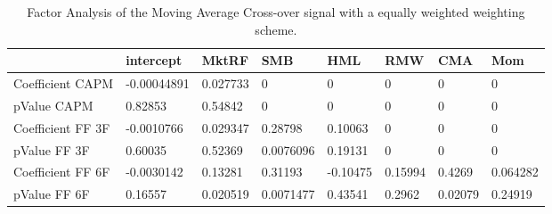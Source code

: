 \begin{table}[H]
\centering
\begin{tabular}{llllllll}
\hline& intercept & MktRF & SMB & HML & RMW & CMA & Mom \\ 
\hline 
Coefficient CAPM & -0.00044891 & 0.027733 & 0 & 0 & 0 & 0 & 0 \\ 
pValue CAPM & 0.82853 & 0.54842 & 0 & 0 & 0 & 0 & 0 \\ 
Coefficient FF 3F & -0.0010766 & 0.029347 & 0.28798 & 0.10063 & 0 & 0 & 0 \\ 
pValue FF 3F & 0.60035 & 0.52369 & 0.0076096 & 0.19131 & 0 & 0 & 0 \\ 
Coefficient FF 6F & -0.0030142 & 0.13281 & 0.31193 & -0.10475 & 0.15994 & 0.4269 & 0.064282 \\ 
pValue FF 6F & 0.16557 & 0.020519 & 0.0071477 & 0.43541 & 0.2962 & 0.02079 & 0.24919 \\ 
\hline
\end{tabular}
\caption{Factor Analysis of the Moving Average Cross-over signal with a equally weighted weighting scheme.}
\label{MAEW_FACTOR}
\end{table}